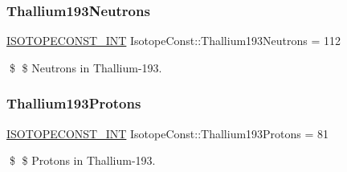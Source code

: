 \subsubsection{\texorpdfstring{Thallium193\+Neutrons}{Thallium193Neutrons}}
{\footnotesize\ttfamily \mbox{\hyperlink{group___isotope_const-_macros_ga5f18360b3e99483a35c32d789e62621c}{I\+S\+O\+T\+O\+P\+E\+C\+O\+N\+S\+T\+\_\+\+I\+NT}} Isotope\+Const\+::\+Thallium193\+Neutrons = 112}

\$ \$ Neutrons in Thallium-\/193. \mbox{\label{group___isotope_const-_thallium-_tl193_gac3639f5382ff514bce082143962c9a58}} 
\subsubsection{\texorpdfstring{Thallium193\+Protons}{Thallium193Protons}}
{\footnotesize\ttfamily \mbox{\hyperlink{group___isotope_const-_macros_ga5f18360b3e99483a35c32d789e62621c}{I\+S\+O\+T\+O\+P\+E\+C\+O\+N\+S\+T\+\_\+\+I\+NT}} Isotope\+Const\+::\+Thallium193\+Protons = 81}

\$ \$ Protons in Thallium-\/193. 
